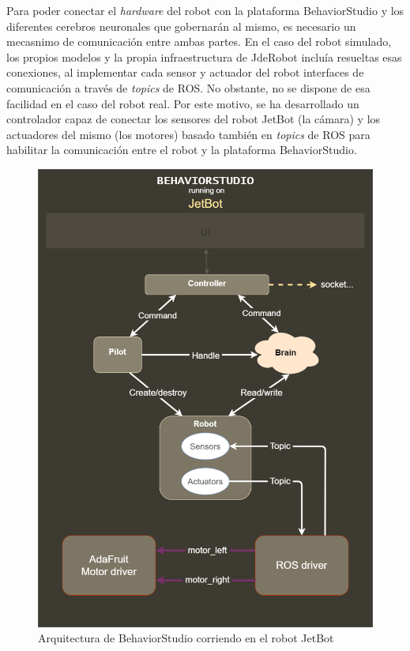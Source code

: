 Para poder conectar el \textit{hardware} del robot con la plataforma BehaviorStudio y los diferentes cerebros neuronales que gobernarán al mismo, es necesario un mecasnimo de comunicación entre ambas partes. En el caso del robot simulado, los propios modelos y la propia infraestructura de JdeRobot incluía resueltas esas conexiones, al implementar cada sensor y actuador del robot interfaces de comunicación a través de \textit{topics} de ROS. No obstante, no se dispone de esa facilidad en el caso del robot real. Por este motivo, se ha desarrollado un controlador capaz de conectar los sensores del robot JetBot (la cámara) y los actuadores del mismo (los motores) basado también en \textit{topics} de ROS para habilitar la comunicación entre el robot y la plataforma BehaviorStudio.

\begin{figure}
  \centering
  \includegraphics[width=.8\linewidth]{img/rosdriver.png}
  \caption{Arquitectura de BehaviorStudio corriendo en el robot JetBot}
  \label{fig:rosdriver}
\end{figure}

